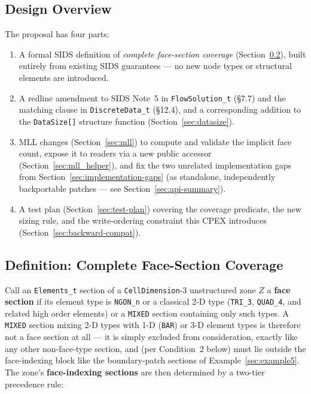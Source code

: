 \documentclass[11pt,letterpaper]{article}
\begin{document}
\subsection{Design Overview}

The proposal has four parts:

\begin{enumerate}[leftmargin=2em]
\item A formal SIDS definition of \emph{complete face-section coverage}
  (Section~\ref{sec:definition}), built entirely from existing SIDS
  guarantees --- no new node types or structural elements are
  introduced.
\item A redline amendment to SIDS Note~5 in \texttt{FlowSolution\_t}
  (\S7.7) and the matching clause in \texttt{DiscreteData\_t}
  (\S12.4), and a corresponding addition to the \texttt{DataSize[]}
  structure function (Section~\ref{sec:datasize}).
\item MLL changes (Section~\ref{sec:mll}) to compute and validate the
  implicit face count, expose it to readers via a new public accessor
  (Section~\ref{sec:mll_helper}), and fix the two unrelated
  implementation gaps from Section~\ref{sec:implementation-gaps} (as
  standalone, independently backportable patches --- see
  Section~\ref{sec:api-summary}).
\item A test plan (Section~\ref{sec:test-plan}) covering the coverage
  predicate, the new sizing rule, and the write-ordering constraint this
  CPEX introduces (Section~\ref{sec:backward-compat}).
\end{enumerate}

\subsection{Definition: Complete Face-Section Coverage}
\label{sec:definition}

Call an \texttt{Elements\_t} section of a \texttt{CellDimension}-3
unstructured zone $Z$ a \textbf{face section} if its element type is
\texttt{NGON\_n} or a classical 2-D type (\texttt{TRI\_3}, \texttt{QUAD\_4},
and related high order elements) or a \texttt{MIXED} section containing only
such types. A \texttt{MIXED}
section mixing 2-D types with 1-D (\texttt{BAR}) or 3-D element types is
therefore not a face section at all --- it is simply excluded from
consideration, exactly like any other non-face-type section, and (per
Condition~2 below) must lie outside the face-indexing block like the
boundary-patch sections of Example~\ref{sec:example5}. The zone's
\textbf{face-indexing sections} are then determined by a two-tier
precedence rule:
\end{document}

